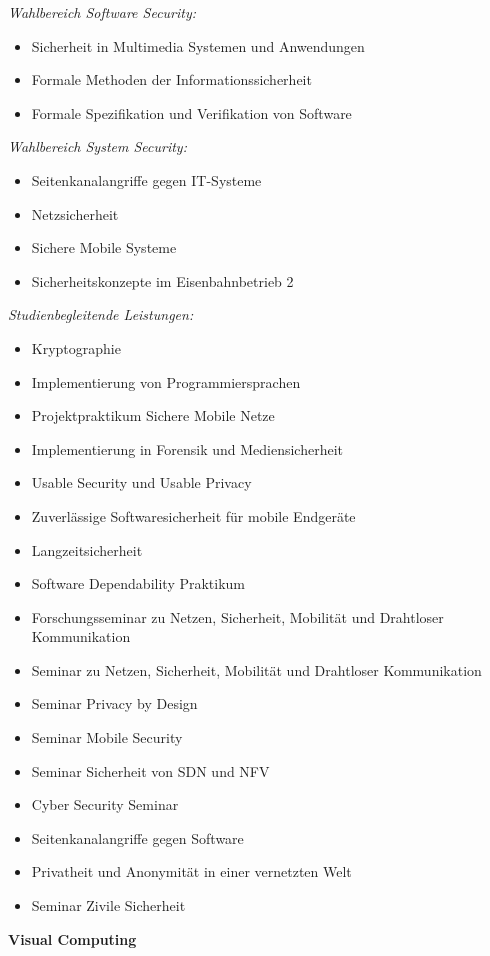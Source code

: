 {\textit{Wahlbereich Software Security:}
\begin{itemize}[noitemsep]
  \item Sicherheit in Multimedia Systemen und Anwendungen
  \item Formale Methoden der Informationssicherheit
  \item Formale Spezifikation und Verifikation von Software
\end{itemize}
\textit{Wahlbereich System Security:}
\begin{itemize}[noitemsep]
  \item Seitenkanalangriffe gegen IT-Systeme
  \item Netzsicherheit
  \item Sichere Mobile Systeme
  \item Sicherheitskonzepte im Eisenbahnbetrieb 2
\end{itemize}
\textit{Studienbegleitende Leistungen:}
\begin{itemize}[noitemsep]
  \item Kryptographie
  \item Implementierung von Programmiersprachen
  \item Projektpraktikum Sichere Mobile Netze
  \item Implementierung in Forensik und Mediensicherheit
  \item Usable Security und Usable Privacy
  \item Zuverlässige Softwaresicherheit für mobile Endgeräte
  \item Langzeitsicherheit
  \item Software Dependability Praktikum
  \item Forschungsseminar zu Netzen, Sicherheit, Mobilität und Drahtloser Kommunikation
  \item Seminar zu Netzen, Sicherheit, Mobilität und Drahtloser Kommunikation
  \item Seminar Privacy by Design
  \item Seminar Mobile Security
  \item Seminar Sicherheit von SDN und NFV
  \item Cyber Security Seminar
  \item Seitenkanalangriffe gegen Software
  \item Privatheit und Anonymität in einer vernetzten Welt
  \item Seminar Zivile Sicherheit
\end{itemize}

\noindent\textbf{Visual Computing}

}
